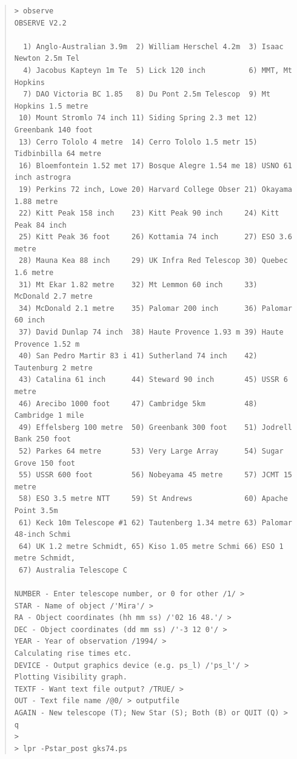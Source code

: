 \documentclass[11pt]{article}
\begin{document}
\begin{quote}\small
\begin{verbatim}
> observe
OBSERVE V2.2

  1) Anglo-Australian 3.9m  2) William Herschel 4.2m  3) Isaac Newton 2.5m Tel
  4) Jacobus Kapteyn 1m Te  5) Lick 120 inch          6) MMT, Mt Hopkins
  7) DAO Victoria BC 1.85   8) Du Pont 2.5m Telescop  9) Mt Hopkins 1.5 metre
 10) Mount Stromlo 74 inch 11) Siding Spring 2.3 met 12) Greenbank 140 foot
 13) Cerro Tololo 4 metre  14) Cerro Tololo 1.5 metr 15) Tidbinbilla 64 metre
 16) Bloemfontein 1.52 met 17) Bosque Alegre 1.54 me 18) USNO 61 inch astrogra
 19) Perkins 72 inch, Lowe 20) Harvard College Obser 21) Okayama 1.88 metre
 22) Kitt Peak 158 inch    23) Kitt Peak 90 inch     24) Kitt Peak 84 inch
 25) Kitt Peak 36 foot     26) Kottamia 74 inch      27) ESO 3.6 metre
 28) Mauna Kea 88 inch     29) UK Infra Red Telescop 30) Quebec 1.6 metre
 31) Mt Ekar 1.82 metre    32) Mt Lemmon 60 inch     33) McDonald 2.7 metre
 34) McDonald 2.1 metre    35) Palomar 200 inch      36) Palomar 60 inch
 37) David Dunlap 74 inch  38) Haute Provence 1.93 m 39) Haute Provence 1.52 m
 40) San Pedro Martir 83 i 41) Sutherland 74 inch    42) Tautenburg 2 metre
 43) Catalina 61 inch      44) Steward 90 inch       45) USSR 6 metre
 46) Arecibo 1000 foot     47) Cambridge 5km         48) Cambridge 1 mile
 49) Effelsberg 100 metre  50) Greenbank 300 foot    51) Jodrell Bank 250 foot
 52) Parkes 64 metre       53) Very Large Array      54) Sugar Grove 150 foot
 55) USSR 600 foot         56) Nobeyama 45 metre     57) JCMT 15 metre
 58) ESO 3.5 metre NTT     59) St Andrews            60) Apache Point 3.5m
 61) Keck 10m Telescope #1 62) Tautenberg 1.34 metre 63) Palomar 48-inch Schmi
 64) UK 1.2 metre Schmidt, 65) Kiso 1.05 metre Schmi 66) ESO 1 metre Schmidt,
 67) Australia Telescope C

NUMBER - Enter telescope number, or 0 for other /1/ >  
STAR - Name of object /'Mira'/ > 
RA - Object coordinates (hh mm ss) /'02 16 48.'/ > 
DEC - Object coordinates (dd mm ss) /'-3 12 0'/ > 
YEAR - Year of observation /1994/ > 
Calculating rise times etc.
DEVICE - Output graphics device (e.g. ps_l) /'ps_l'/ >
Plotting Visibility graph.
TEXTF - Want text file output? /TRUE/ > 
OUT - Text file name /@0/ > outputfile
AGAIN - New telescope (T); New Star (S); Both (B) or QUIT (Q) > q
>
> lpr -Pstar_post gks74.ps
\end{verbatim}                                                            
\end{quote}
\end{document}
